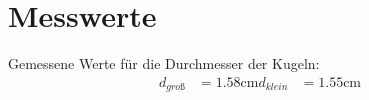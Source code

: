 \section{Messwerte}
\label{sec:Messwerte}

Gemessene Werte für die Durchmesser der Kugeln:
\begin{align*}
    d_{groß} &= 1.58\unit{\centi\meter}
    d_{klein} &= 1.55\unit{\centi\meter}
\end{align*}